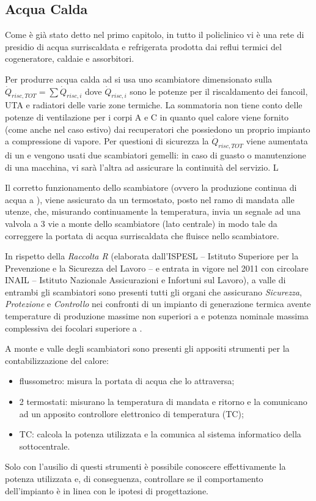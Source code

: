 \subsection{Acqua Calda}
Come è già stato detto nel primo capitolo, in tutto il policlinico vi è una rete di presidio di acqua surriscaldata e refrigerata prodotta dai reflui termici del cogeneratore, caldaie e assorbitori. 

Per produrre acqua calda ad  si usa uno scambiatore dimensionato sulla $\dot{Q}_{risc,TOT} = \sum \dot{Q}_{risc,i}$ dove $\dot{Q}_{risc,i}$ sono le potenze per il riscaldamento dei fancoil, UTA e radiatori delle varie zone termiche. La sommatoria non tiene conto delle potenze di ventilazione per i corpi A e C in quanto quel calore viene fornito (come anche nel caso estivo) dai recuperatori che possiedono un proprio impianto a compressione di vapore. Per questioni di sicurezza la $\dot{Q}_{risc,TOT}$ viene aumentata di un  e vengono usati due scambiatori gemelli: in caso di guasto o manutenzione di una macchina, vi sarà l'altra ad assicurare la continuità del servizio. L

Il corretto funzionamento dello scambiatore (ovvero la produzione continua di acqua a ), viene assicurato da un termostato, posto nel ramo di mandata alle utenze, che, misurando continuamente la temperatura, invia un segnale ad una valvola a 3 vie a monte dello scambiatore (lato centrale) in modo tale da correggere la portata di acqua surriscaldata che fluisce nello scambiatore. 

In rispetto della \emph{Raccolta R} (elaborata dall'ISPESL -- Istituto Superiore per la Prevenzione e la Sicurezza del Lavoro -- e entrata in vigore nel \num{2011} con circolare INAIL -- Istituto Nazionale Assicurazioni e Infortuni sul Lavoro), a valle di entrambi gli scambiatori sono presenti tutti gli organi che assicurano \emph{Sicurezza}, \emph{Protezione} e \emph{Controllo} nei confronti di un impianto di generazione termica avente temperature di produzione massime non superiori a  e potenza nominale massima complessiva dei focolari superiore a .

A monte e valle degli scambiatori sono presenti gli appositi strumenti per la contabilizzazione del calore:
\begin{itemize}
	\item flussometro: misura la portata di acqua che lo attraversa;
	\item 2 termostati: misurano la temperatura di mandata e ritorno e la comunicano ad un apposito controllore elettronico di temperatura (TC);
	\item TC: calcola la potenza utilizzata e la comunica al sistema informatico della sottocentrale. 
\end{itemize}
Solo con l'ausilio di questi strumenti è possibile conoscere effettivamente la potenza utilizzata e, di conseguenza, controllare se il comportamento dell'impianto è in linea con le ipotesi di progettazione.

